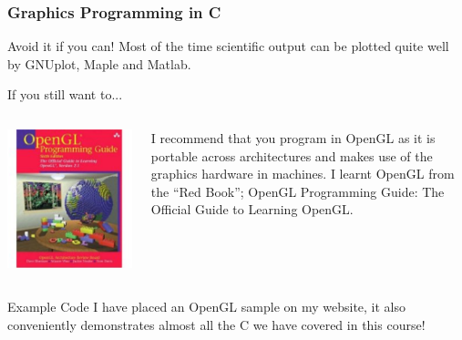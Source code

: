 \documentclass[table]{beamer}
\begin{document}
\begin{frame}
\frametitle{Graphics Programming in C}
\begin{alertblock}{Avoid it if you can!}
Most of the time scientific output can be plotted quite well by GNUplot, Maple and Matlab.
\end{alertblock}
\begin{block}{If you still want to...}
\begin{columns}
\begin{column}{1.5cm}
\includegraphics[width=1.6\textwidth]{opengl}
\end{column}
\begin{column}{8cm}
I recommend that you program in OpenGL as it is portable across architectures and makes use of the graphics hardware in machines. I learnt OpenGL from the ``Red Book''; OpenGL Programming Guide: The Official Guide to Learning OpenGL.
\end{column}
\end{columns}
\end{block}
\begin{exampleblock}{Example Code}
I have placed an OpenGL sample on my website, it also conveniently demonstrates almost all the C we have covered in this course!
\end{exampleblock}
\end{frame}
\end{document}
